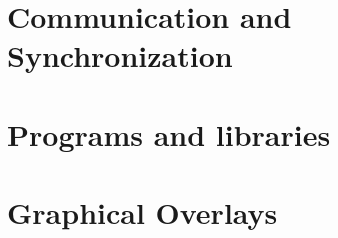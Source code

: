 \documentclass[main.tex,fontsize=8pt,paper=a4,paper=portrait,DIV=calc,]{scrartcl}
\begin{document}
\section{Communication and Synchronization}

\section{Programs and libraries}

\section{Graphical Overlays}
\end{document}
